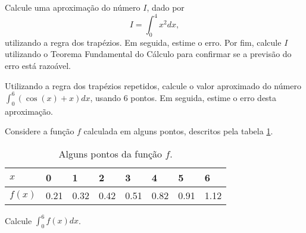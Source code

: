 %
%
%
%
%
%
%
%
%
%
%
%
%
%
%
%
%
%
%
%
%
%
%

\begin{ex}
Calcule uma aproximação do número $I$, dado por $$I=\int_0^4 x^2 dx,$$ utilizando a regra dos trapézios. Em seguida, estime o erro. Por fim, calcule $I$ utilizando o Teorema Fundamental do Cálculo para confirmar se a previsão do erro está razoável.
\end{ex}

\begin{ex}
Utilizando a regra dos trapézios repetidos, calcule o valor aproximado do número $\int_0^6 (\cos(x) + x)dx$, usando $6$ pontos. Em seguida, estime o erro desta aproximação.
\end{ex}

\begin{ex}
Considere a função $f$ calculada em alguns pontos, descritos pela tabela \ref{trap.inte}.

\begin{table}[htb]
\centering
\caption{Alguns pontos da função $f$.}
\label{trap.inte}
\begin{tabular}{@{}llllllll@{}}
\toprule
$x$    & 0    & 1    & 2    & 3    & 4    & 5    & 6    \\ \midrule
$f(x)$ & 0.21 & 0.32 & 0.42 & 0.51 & 0.82 & 0.91 & 1.12 \\ \bottomrule
\end{tabular}
\end{table}

Calcule $\int_0^6 f(x)dx$.
\end{ex}


